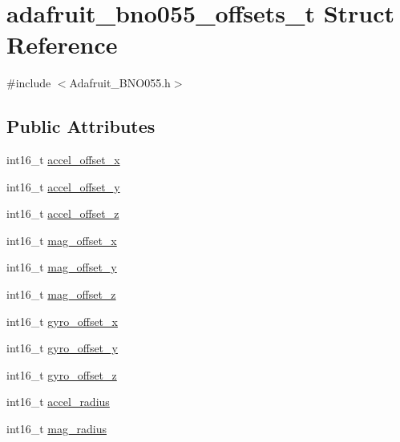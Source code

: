 \hypertarget{structadafruit__bno055__offsets__t}{}\section{adafruit\+\_\+bno055\+\_\+offsets\+\_\+t Struct Reference}
\label{structadafruit__bno055__offsets__t}


{\ttfamily \#include $<$Adafruit\+\_\+\+B\+N\+O055.\+h$>$}

\subsection*{Public Attributes}
\begin{DoxyCompactItemize}
\item 
int16\+\_\+t \hyperlink{structadafruit__bno055__offsets__t_a780dba7b02a272e404f7b106447917c1}{accel\+\_\+offset\+\_\+x}
\item 
int16\+\_\+t \hyperlink{structadafruit__bno055__offsets__t_aece1106c578d9d3b12c11817d301414f}{accel\+\_\+offset\+\_\+y}
\item 
int16\+\_\+t \hyperlink{structadafruit__bno055__offsets__t_a1896c9286039905a69dc86bfca3940bc}{accel\+\_\+offset\+\_\+z}
\item 
int16\+\_\+t \hyperlink{structadafruit__bno055__offsets__t_a0f424e0edf4c5dbfd876a936d5707548}{mag\+\_\+offset\+\_\+x}
\item 
int16\+\_\+t \hyperlink{structadafruit__bno055__offsets__t_ad5fb6f2cb2b5fc0f213a451f45c08786}{mag\+\_\+offset\+\_\+y}
\item 
int16\+\_\+t \hyperlink{structadafruit__bno055__offsets__t_ae459af922307a2d61c7775f50f2c9dcc}{mag\+\_\+offset\+\_\+z}
\item 
int16\+\_\+t \hyperlink{structadafruit__bno055__offsets__t_ac2fdd217eb5429fa19419b5fe07c315c}{gyro\+\_\+offset\+\_\+x}
\item 
int16\+\_\+t \hyperlink{structadafruit__bno055__offsets__t_aa7c8de9501cb39de5252d54cc4a6fa28}{gyro\+\_\+offset\+\_\+y}
\item 
int16\+\_\+t \hyperlink{structadafruit__bno055__offsets__t_ae5c2c41cd0ec245931e563cd0986e3c1}{gyro\+\_\+offset\+\_\+z}
\item 
int16\+\_\+t \hyperlink{structadafruit__bno055__offsets__t_a5b7cb188b0937e4218caddc3fd5b43cd}{accel\+\_\+radius}
\item 
int16\+\_\+t \hyperlink{structadafruit__bno055__offsets__t_ad0a4020e407ba70f2802f04c5fd840b6}{mag\+\_\+radius}
\end{DoxyCompactItemize}


